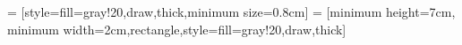 

 = [style={fill=gray!20,draw,thick,minimum size=0.8cm}]
 = [minimum height=7cm, minimum width=2cm,rectangle,style={fill=gray!20,draw,thick}]


